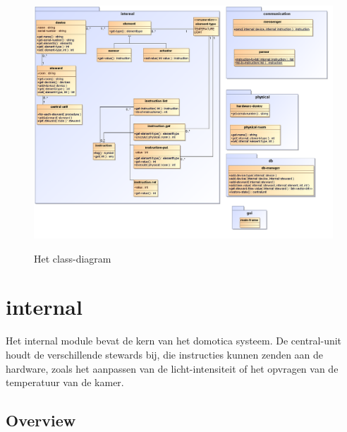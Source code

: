 \documentclass{article}
\begin{document}
\begin{figure}
	\begin{center}
		\href{run:./class-diagram/class-diagram.png}{\includegraphics[width=\columnwidth]{class-diagram/class-diagram.png}}
	\end{center}
	\caption{Het class-diagram}
\end{figure}

\newpage
\hypertarget{internal}{\section{internal}}
\label{internal}
Het internal module bevat de kern van het domotica systeem. De central-unit houdt de verschillende stewards bij, die instructies kunnen zenden aan de hardware, zoals het aanpassen van de licht-intensiteit of het opvragen van de temperatuur van de kamer.

\subsection{Overview}
\end{document}
